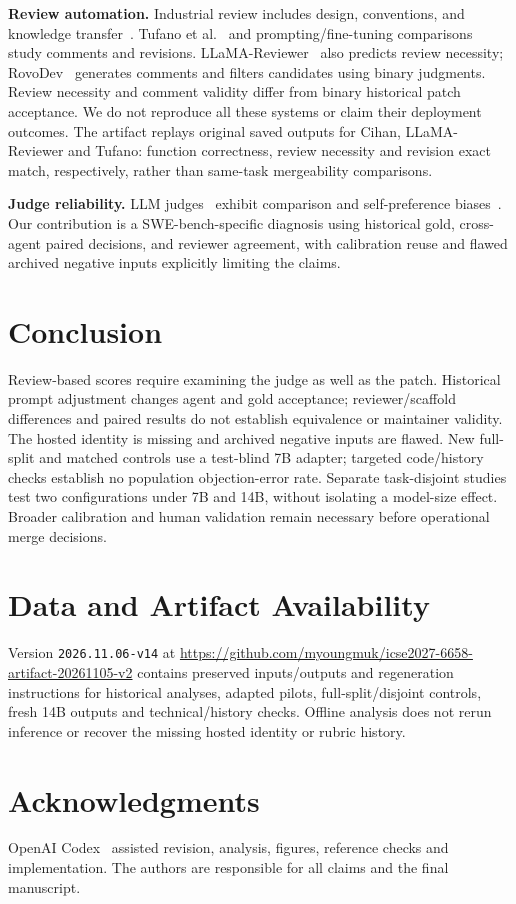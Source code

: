 \documentclass[10pt,conference]{IEEEtran}
\begin{document}
\textbf{Review automation.} Industrial review includes design, conventions, and knowledge
transfer~\cite{modernreview,bacchelli2013review,rigby2013convergent}.
Tufano et al.~\cite{tufanoreview} and prompting/fine-tuning
comparisons~\cite{promptreview} study comments and revisions. LLaMA-Reviewer~\cite{llamareviewer}
also predicts review necessity; RovoDev~\cite{rovodev} generates comments and filters
candidates using binary judgments. Review necessity and comment validity differ from
binary historical patch acceptance. We do not reproduce all these systems or claim
their deployment outcomes. The artifact replays original saved outputs for Cihan,
LLaMA-Reviewer and Tufano: function correctness, review necessity and revision exact
match, respectively, rather than same-task mergeability comparisons.

\textbf{Judge reliability.} LLM judges~\cite{llmjudge} exhibit comparison and self-preference
biases~\cite{wang2024fair,panickssery2024selfpref}. Our contribution is a SWE-bench-specific
diagnosis using historical gold, cross-agent paired decisions, and reviewer agreement,
with calibration reuse and flawed archived negative inputs explicitly limiting the claims.

\section{Conclusion}
Review-based scores require examining the judge as well as the patch. Historical prompt
adjustment changes agent and gold acceptance; reviewer/scaffold differences and paired
results do not establish equivalence or maintainer validity. The hosted identity is
missing and archived negative inputs are flawed. New full-split and matched controls
use a test-blind 7B adapter; targeted code/history checks establish no population
objection-error rate. Separate task-disjoint studies test two configurations under
7B and 14B, without isolating a model-size effect. Broader calibration and human validation remain necessary before
operational merge decisions.

\section*{Data and Artifact Availability}
Version \texttt{2026.11.06-v14} at
\url{https://github.com/myoungmuk/icse2027-6658-artifact-20261105-v2}
contains preserved inputs/outputs and regeneration instructions for historical analyses,
adapted pilots, full-split/disjoint controls, fresh 14B outputs and technical/history
checks. Offline analysis does not rerun inference or recover the missing hosted identity
or rubric history.

\section*{Acknowledgments}
OpenAI Codex~\cite{openaicodex} assisted revision, analysis, figures, reference checks and
implementation. The authors are responsible for all claims and the final manuscript.

\clearpage


\end{document}
